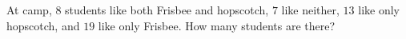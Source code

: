 At camp, $8$ students like both Frisbee and hopscotch, $7$ like neither, $13$ like only hopscotch, and $19$ like only Frisbee. How many students are there?
